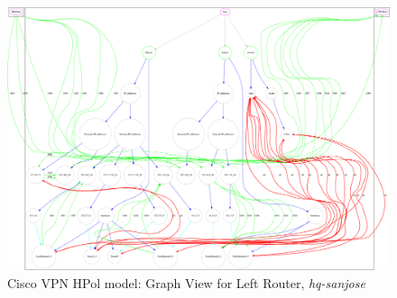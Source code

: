 \documentclass[12pt,letterpaper]{report}
\begin{document}
\begin{figure}
\centering


\includegraphics[angle=90, height=.9\textheight, width=\textwidth]{s2svpnA.pdf}

\caption{Cisco VPN HPol model: Graph View for Left Router, \textit{hq-sanjose}}%
\label{CiscoRouterAGraph}%
\end{figure}
\end{document}
